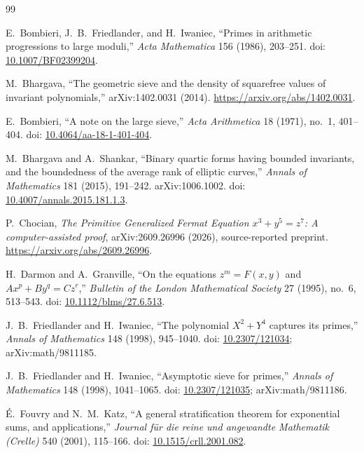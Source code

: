\documentclass[11pt,a4paper]{article}
\begin{document}
\begingroup
\small
\raggedright
\setlength{\itemsep}{0pt}
\setlength{\parskip}{0pt}
\setlength{\parsep}{0pt}
\begin{thebibliography}{99}

E.~Bombieri, J.~B.~Friedlander, and H.~Iwaniec, ``Primes in arithmetic progressions to large moduli,''
\emph{Acta Mathematica} 156 (1986), 203--251. doi:
\href{https://doi.org/10.1007/BF02399204}{10.1007/BF02399204}.

M.~Bhargava, ``The geometric sieve and the density of squarefree values of invariant polynomials,''
arXiv:1402.0031 (2014). \url{https://arxiv.org/abs/1402.0031}.

E.~Bombieri, ``A note on the large sieve,''
\emph{Acta Arithmetica} 18 (1971), no.\ 1, 401--404. doi:
\href{https://doi.org/10.4064/aa-18-1-401-404}{10.4064/aa-18-1-401-404}.

M.~Bhargava and A.~Shankar, ``Binary quartic forms having bounded invariants, and the boundedness of the average rank of elliptic curves,'' \emph{Annals of Mathematics} 181 (2015), 191--242. arXiv:1006.1002.
doi: \href{https://doi.org/10.4007/annals.2015.181.1.3}{10.4007/annals.2015.181.1.3}.

P.~Chocian, \emph{The Primitive Generalized Fermat Equation
$x^3+y^5=z^7$: A computer-assisted proof},
arXiv:2609.26996 (2026), source-reported preprint.
\url{https://arxiv.org/abs/2609.26996}.

H.~Darmon and A.~Granville, ``On the equations $z^m=F(x,y)$ and $Ax^p+By^q=Cz^r$,''
\emph{Bulletin of the London Mathematical Society} 27 (1995),
no.\ 6, 513--543. doi:
\href{https://doi.org/10.1112/blms/27.6.513}{10.1112/blms/27.6.513}.

J.~B.~Friedlander and H.~Iwaniec, ``The polynomial $X^2+Y^4$ captures its primes,''
\emph{Annals of Mathematics} 148 (1998), 945--1040.
doi: \href{https://doi.org/10.2307/121034}{10.2307/121034};
arXiv:math/9811185.

J.~B.~Friedlander and H.~Iwaniec, ``Asymptotic sieve for primes,''
\emph{Annals of Mathematics} 148 (1998), 1041--1065.
doi: \href{https://doi.org/10.2307/121035}{10.2307/121035};
arXiv:math/9811186.

É.~Fouvry and N.~M.~Katz, ``A general stratification theorem for exponential sums, and applications,''
\emph{Journal für die reine und angewandte Mathematik (Crelle)} 540 (2001), 115--166. doi:
\href{https://doi.org/10.1515/crll.2001.082}{10.1515/crll.2001.082}.


\end{thebibliography}
\end{document}
